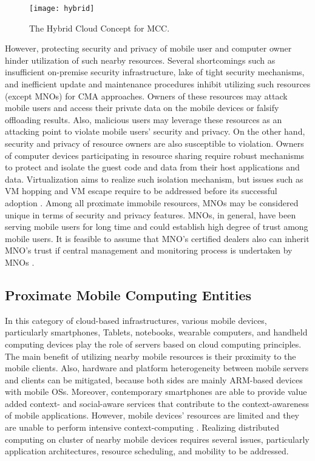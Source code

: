 \documentclass[publish]{IEEEtran}
\begin{document}
\begin{figure*}
\centering
\texttt{[image: hybrid]} 
\caption{The Hybrid Cloud Concept for MCC.} \label{hybrid}
\end{figure*}


However, protecting security and privacy of mobile user and computer owner hinder utilization of such nearby resources. Several shortcomings such as insufficient on-premise security infrastructure, lake of tight security mechanisms, and inefficient update and maintenance procedures inhibit utilizing such resources (except MNOs) for CMA approaches. Owners of these resources may attack mobile users and access their private data on the mobile devices or falsify offloading results. Also, malicious users may leverage these resources as an attacking point to violate mobile users' security and privacy. On the other hand, security and privacy of resource owners are also susceptible to violation. Owners of computer devices participating in resource sharing require robust mechanisms to protect and isolate the guest code and data from their host applications and data. Virtualization aims to realize such isolation mechanism, but issues such as VM hopping and VM escape require to be addressed before its successful adoption \cite{Owens}. Among all proximate immobile resources, MNOs may be considered unique in terms of security and privacy features. MNOs, in general, have been serving mobile users for long time and could establish high degree of trust among mobile users. It is feasible to assume that MNO's certified dealers also can inherit MNO's trust if central management and monitoring process is undertaken by MNOs \cite{SAMI}.

\subsection{Proximate Mobile Computing Entities}
In this category of cloud-based infrastructures, various mobile devices, particularly smartphones, Tablets, notebooks, wearable computers, and handheld computing devices play the role of servers based on cloud computing principles. The main benefit of utilizing nearby mobile resources is their proximity to the mobile clients. Also, hardware and platform heterogeneity \cite{Z2012} between mobile servers and clients can be mitigated, because both sides are mainly ARM-based devices with mobile OSs. Moreover, contemporary smartphones are able to provide value added context- and social-aware services \cite{Lane2010,Lukowicz2012} that contribute to the context-awareness of mobile applications. However, mobile devices' resources are limited and they are unable to perform intensive context-computing \cite{Makris2013}. Realizing distributed computing on cluster of nearby mobile devices requires several issues, particularly application architectures, resource scheduling, and mobility to be addressed.
\end{document}
